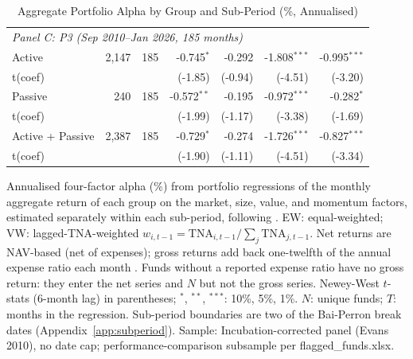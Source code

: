 \begin{table}[!htbp]
{\begin{tabular}[t]{lrrrrrr}
\hline
\multicolumn{7}{l}{\textit{Panel C: P3 (Sep 2010--Jan 2026, 185 months)}}\\
\hspace{1em}Active & 2,147 & 185 & -0.745$^{*}$ & -0.292 & -1.808$^{***}$ & -0.995$^{***}$\\
\hspace{1em}t(coef) &  &  & (-1.85) & (-0.94) & (-4.51) & (-3.20)\\
\hspace{1em}Passive & 240 & 185 & -0.572$^{**}$ & -0.195 & -0.972$^{***}$ & -0.282$^{*}$\\
\hspace{1em}t(coef) &  &  & (-1.99) & (-1.17) & (-3.38) & (-1.69)\\
\midrule
\hspace{1em}Active + Passive & 2,387 & 185 & -0.729$^{*}$ & -0.274 & -1.726$^{***}$ & -0.827$^{***}$\\
\hspace{1em}t(coef) &  &  & (-1.90) & (-1.11) & (-4.51) & (-3.34)\\
\bottomrule
\end{tabular}%
}
\setlength{\tabletempwidth}{\wd\tabletempbox}
\ifdim\tabletempwidth>\linewidth\setlength{\tabletempwidth}{\linewidth}\fi
\begin{minipage}{\tabletempwidth}
\captionsetup{width=\linewidth}
\caption{\label{tab:subperiod_perf_aggregate}Aggregate Portfolio Alpha by Group and Sub-Period (\%, Annualised)}
\ifdim\wd\tabletempbox>\linewidth
  \resizebox{\linewidth}{!}{\usebox{\tabletempbox}}
\else
  \usebox{\tabletempbox}
\fi
\par\medskip
\begin{singlespace}\footnotesize\noindent
Annualised \textcite{Carhart1997} four-factor alpha (\%) from portfolio regressions of the monthly aggregate return of each group on the market, size, value, and momentum factors, estimated separately within each sub-period, following \textcite{FamaFrench2010}. EW: equal-weighted; VW: lagged-TNA-weighted $w_{i,t-1} = \text{TNA}_{i,t-1} / \sum_j \text{TNA}_{j,t-1}$. Net returns are NAV-based (net of expenses); gross returns add back one-twelfth of the annual expense ratio each month \parencite{FamaFrench2010}. Funds without a reported expense ratio have no gross return: they enter the net series and $N$ but not the gross series. Newey-West $t$-stats (6-month lag) in parentheses; $^{*}$, $^{**}$, $^{***}$: 10\%, 5\%, 1\%. $N$: unique funds; $T$: months in the regression. Sub-period boundaries are two of the Bai-Perron break dates (Appendix~\ref{app:subperiod}). Sample: Incubation-corrected panel (Evans 2010), no date cap; performance-comparison subsample per flagged\_funds.xlsx.
\end{singlespace}
\end{minipage}
\end{table}

